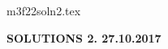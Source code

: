 \documentclass[12pt]{article}
\begin{document}
\def\R{\mathbb{R}}
\def\Z{\mathbb{Z}}
\def\N{\mathbb{N}}
\def\Q{\mathbb{Q}}
\def\T{\mathbb{T}}
\def\hb{\hfil \break}
\def\ni{\noindent}
\def\i{\indent}
\def\a{\alpha}
\def\b{\beta}
\def\e{\epsilon}
\def\d{\delta}
\def\D{\Delta}
\def\g{\gamma}
\def\qq{\qquad}
\def\L{\Lambda}
\def\E{\cal E}
\def\G{\Gamma}
\def\F{\cal F}
\def\K{\cal K}
\def\A{\cal A}
\def\B{\cal B}
\def\C{\cal C}
\def\M{\cal M}
\def\P{\cal P}
\def\Om{\Omega}
\def\om{\omega}
\def\s{\sigma}
\def\t{\theta}
\def\th{\theta}
\def\Th{\Theta}
\def\z{\zeta}
\def\p{\phi}
\def\m{\mu}
\def\n{\nu}
\def\l{\lambda}
\def\Si{\Sigma}
\def\q{\quad}
\def\qq{\qquad}
\def\half{\frac{1}{2}}
\def\hb{\hfil \break}
\def\half{\frac{1}{2}}
\def\pa{\partial}
\def\r{\rho}
\def\hb{\hfil \break}
\def\ni{\noindent}
\def\i{\indent}
\def\ti{\tilde}
\ni m3f22soln2.tex \\
\begin{center}
{\bf SOLUTIONS 2.  27.10.2017}
\end{center}
\end{document}
